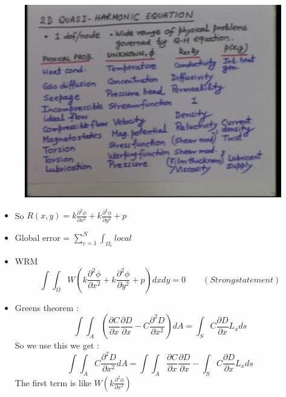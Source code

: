 	\begin{frame}
		\begin{figure}
			\centering
			\includegraphics[width=0.7\linewidth]{Figure/fig7}
		\end{figure}
	\end{frame}


	
	\begin{frame}
		\begin{itemize}
			\item So $R(x,y) = k \frac{\partial^2 \phi}{\partial x^2} + k \frac{\partial^2 \phi}{\partial y^2} + p$
			\item Global error  =  $\sum_{e=1}^N  \int_{\Omega_e}local$
			\item WRM 
			\begin{equation}
				\int \int_{\Omega} W   \left( k \frac{\partial^2 \phi}{\partial x^2} + k \frac{\partial^2 \phi}{\partial y^2} + p \right) dx dy = 0  \qquad( Strong statement)
			\end{equation}
			\item Greens theorem : 
			\begin{equation}
				\int \int_A \left( \frac{\partial C}{\partial x} \frac{\partial D}{\partial x} - C \frac{\partial^2 D}{\partial x^2} \right) dA =  \int_S C \frac{\partial  D}{\partial x} L_x ds
			\end{equation}
			So we use this we get :
			\begin{equation}
				\int \int_A C \frac{\partial^2 D}{\partial x^2}  dA =  
				\int \int_A \frac{\partial C}{\partial x} \frac{\partial D}{\partial x} - 
				\int_S C \frac{\partial  D}{\partial x} L_x ds
			\end{equation}
			The first term is like $W(k \frac{\partial^2 \phi}{\partial x^2})$
		\end{itemize}
	\end{frame}


